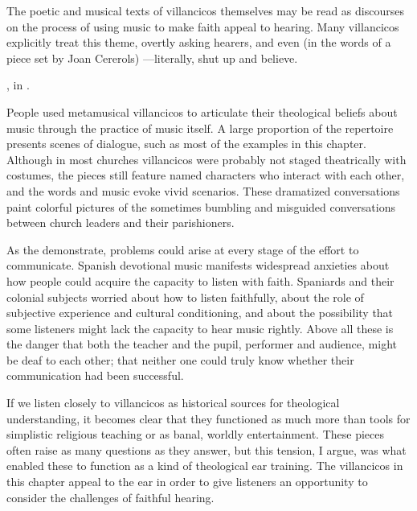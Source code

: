 The poetic and musical texts of villancicos themselves may be read as discourses
on the process of using music to make faith appeal to hearing.
Many villancicos explicitly treat this theme, overtly asking hearers,
  and even (in the words of a piece set
by Joan Cererols) ---literally, shut up and believe.%
    \begin{Footnote}
        , in
        \autocite[205--212]{Cererols:MEM-VC}.
    \end{Footnote}
People used metamusical villancicos to articulate their theological beliefs
about music through the practice of music itself.
A large proportion of the repertoire presents scenes of dialogue, such as most
of the examples in this chapter.
Although in most churches villancicos were probably not staged theatrically with
costumes, the pieces still feature named characters who interact with each
other, and the words and music evoke vivid scenarios.
These dramatized conversations paint colorful pictures of the sometimes bumbling
and misguided conversations between church leaders and their parishioners.

As the  demonstrate, problems could arise at
every stage of the effort to communicate.
Spanish devotional music manifests widespread anxieties about how people could
acquire the capacity to listen with faith.
Spaniards and their colonial subjects worried about how to listen faithfully,
about the role of subjective experience and cultural conditioning, and about the
possibility that some listeners might lack the capacity to hear music rightly.
Above all these is the danger that both the teacher and the pupil, performer and
audience, might be deaf to each other; that neither one could truly know whether
their communication had been successful.

If we listen closely to villancicos as historical sources for theological
understanding, it becomes clear that they functioned as much more than tools for
simplistic religious teaching or as banal, worldly entertainment.
These pieces often raise as many questions as they answer, but this tension, I
argue, was what enabled these to function as a kind of theological ear training.
The villancicos in this chapter appeal to the ear in order to give listeners an
opportunity to consider the challenges of faithful hearing.

\section{}

